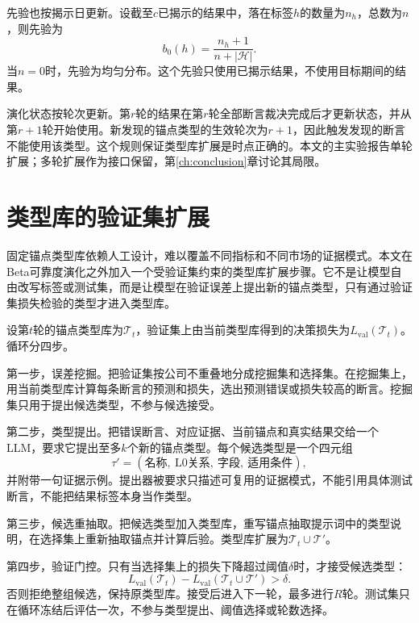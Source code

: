 先验也按揭示日更新。设截至$c$已揭示的结果中，落在标签$h$的数量为$n_h$，总数为$n$，则先验为
\begin{equation}
b_0(h)=\frac{n_h+1}{n+|\mathcal H|}.
\label{eq:prior}
\end{equation}
当$n=0$时，先验为均匀分布。这个先验只使用已揭示结果，不使用目标期间的结果。

演化状态按轮次更新。第$r$轮的结果在第$r$轮全部断言裁决完成后才更新状态，并从第$r+1$轮开始使用。新发现的锚点类型的生效轮次为$r+1$，因此触发发现的断言不能使用该类型。这个规则保证类型库扩展是时点正确的。本文的主实验报告单轮扩展；多轮扩展作为接口保留，第\ref{ch:conclusion}章讨论其局限。

\section{类型库的验证集扩展}

固定锚点类型库依赖人工设计，难以覆盖不同指标和不同市场的证据模式。本文在Beta可靠度演化之外加入一个受验证集约束的类型库扩展步骤。它不是让模型自由改写标签或测试集，而是让模型在验证误差上提出新的锚点类型，只有通过验证集损失检验的类型才进入类型库。

设第$t$轮的锚点类型库为$\mathcal T_t$，验证集上由当前类型库得到的决策损失为$L_{\mathrm{val}}(\mathcal T_t)$。循环分四步。

第一步，误差挖掘。把验证集按公司不重叠地分成挖掘集和选择集。在挖掘集上，用当前类型库计算每条断言的预测和损失，选出预测错误或损失较高的断言。挖掘集只用于提出候选类型，不参与候选接受。

第二步，类型提出。把错误断言、对应证据、当前锚点和真实结果交给一个LLM，要求它提出至多$k$个新的锚点类型。每个候选类型是一个四元组
\begin{equation}
\tau'=(\text{名称},\ \text{L0关系},\ \text{字段},\ \text{适用条件}),
\label{eq:candidatetype}
\end{equation}
并附带一句证据示例。提出器被要求只描述可复用的证据模式，不能引用具体测试断言，不能把结果标签本身当作类型。

第三步，候选重抽取。把候选类型加入类型库，重写锚点抽取提示词中的类型说明，在选择集上重新抽取锚点并计算后验。类型库扩展为$\mathcal T_t\cup\mathcal T'$。

第四步，验证门控。只有当选择集上的损失下降超过阈值$\delta$时，才接受候选类型：
\begin{equation}
L_{\mathrm{val}}(\mathcal T_t)-L_{\mathrm{val}}(\mathcal T_t\cup\mathcal T')>\delta.
\label{eq:typeaccept}
\end{equation}
否则拒绝整组候选，保持原类型库。接受后进入下一轮，最多进行$R$轮。测试集只在循环冻结后评估一次，不参与类型提出、阈值选择或轮数选择。

